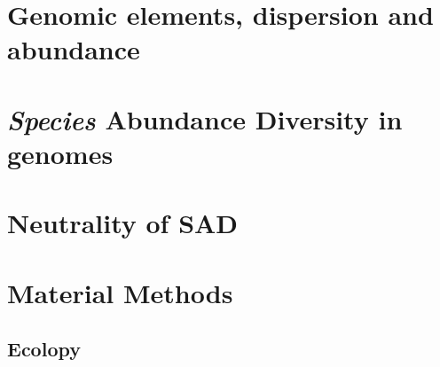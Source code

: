 
\section{Genomic elements, dispersion and abundance}

\section{\textit{Species} Abundance Diversity in genomes}

\section{Neutrality of SAD}

\section{Material Methods}
\subsection{Ecolopy}
